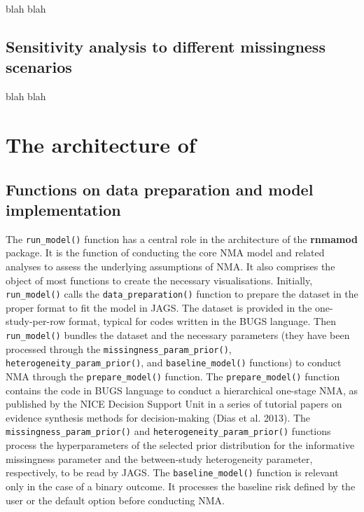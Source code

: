 blah blah

\hypertarget{sensitivity-analysis-to-different-missingness-scenarios}{%
\subsection{Sensitivity analysis to different missingness scenarios}\label{sensitivity-analysis-to-different-missingness-scenarios}}

blah blah

\hypertarget{the-architecture-of}{%
\section{\texorpdfstring{The architecture of }{The architecture of }}\label{the-architecture-of}}

\hypertarget{functions-on-data-preparation-and-model-implementation}{%
\subsection{Functions on data preparation and model implementation}\label{functions-on-data-preparation-and-model-implementation}}

The \texttt{run\_model()} function has a central role in the architecture of the \textbf{rnmamod}
package. It is the function of conducting the core NMA model and related analyses
to assess the underlying assumptions of NMA. It also comprises the object of most
functions to create the necessary visualisations. Initially, \texttt{run\_model()} calls
the \texttt{data\_preparation()} function to prepare the dataset in the proper format to
fit the model in JAGS. The dataset is provided in the one-study-per-row format,
typical for codes written in the BUGS language. Then \texttt{run\_model()} bundles the
dataset and the necessary parameters (they have been processed through the
\texttt{missingness\_param\_prior()}, \texttt{heterogeneity\_param\_prior()}, and \texttt{baseline\_model()}
functions) to conduct NMA through the \texttt{prepare\_model()} function. The \texttt{prepare\_model()}
function contains the code in BUGS language to conduct a hierarchical one-stage
NMA, as published by the NICE Decision Support Unit in a series of tutorial papers
on evidence synthesis methods for decision-making (Dias et al. 2013). The \texttt{missingness\_param\_prior()}
and \texttt{heterogeneity\_param\_prior()} functions process the hyperparameters of the
selected prior distribution for the informative missingness parameter and the
between-study heterogeneity parameter, respectively, to be read by JAGS.
The \texttt{baseline\_model()} function is relevant only in the case of a binary outcome.
It processes the baseline risk defined by the user or the default option before
conducting NMA.

